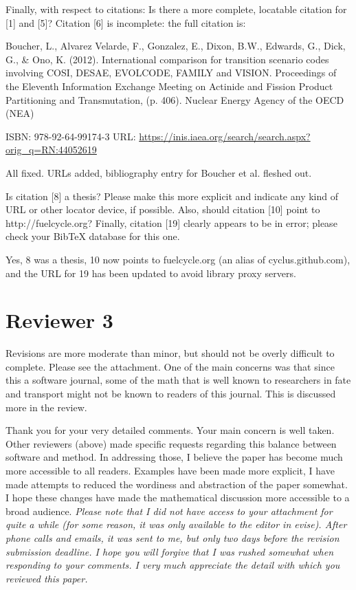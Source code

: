 \documentclass[answers,12pt]{exam}
\begin{document}
\begin{questions}
\question Finally, with respect to citations: Is there a more complete, 
locatable citation for [1] and [5]? Citation [6] is incomplete: the full 
citation is:

Boucher, L., Alvarez Velarde, F., Gonzalez, E., Dixon, B.W., Edwards, G., Dick, 
G., \& Ono, K. (2012). International comparison for transition scenario codes 
involving COSI, DESAE, EVOLCODE, FAMILY and VISION. Proceedings of the Eleventh 
Information Exchange Meeting on Actinide and Fission Product Partitioning and 
Transmutation, (p. 406). Nuclear Energy Agency of the OECD (NEA)

ISBN: 978-92-64-99174-3
URL: \url{https://inis.iaea.org/search/search.aspx?orig_q=RN:44052619}
\begin{solution}
All fixed. URLs added, bibliography entry for Boucher et al. fleshed out.
\end{solution}

\question Is citation [8] a thesis? Please make this more explicit and indicate 
any kind of URL or other locator device, if possible. Also, should citation 
[10] point to http://fuelcycle.org? Finally, citation [19] clearly appears to 
be in error; please check your BibTeX database for this one.
\begin{solution}
        Yes, 8 was a thesis, 10 now points to fuelcycle.org (an alias of 
        cyclus.github.com), and the URL for 19 has been updated to avoid 
        library proxy servers.
\end{solution}

\section*{Reviewer 3}

\question   Revisions are more moderate than minor, but should not be overly 
difficult
to complete. Please see the attachment. One of the main concerns was that since
this a software journal, some of the math that is well known to researchers in
fate and transport might not be known to readers of this journal. This is
discussed more in the review.
\begin{solution}
Thank you for your very detailed comments. Your main concern is well taken. 
Other reviewers (above) made specific requests regarding this balance between 
software and method.  In addressing those, I believe the paper has become much 
more accessible to all readers. Examples have been made more explicit, I have 
made attempts to reduced the wordiness and abstraction of the paper somewhat. I 
hope these changes have made the mathematical discussion more accessible to a 
broad audience.  \emph{Please note that I did not have access to your attachment for 
quite a while (for some reason, it was only available to the editor in 
evise). After phone calls and emails, it was sent to me, but 
only two days before the revision submission deadline. I hope you will forgive 
that I was rushed somewhat when responding to your comments. I very much 
        appreciate the detail with which you reviewed this paper.} 
\end{solution}


\end{questions}
\end{document}
